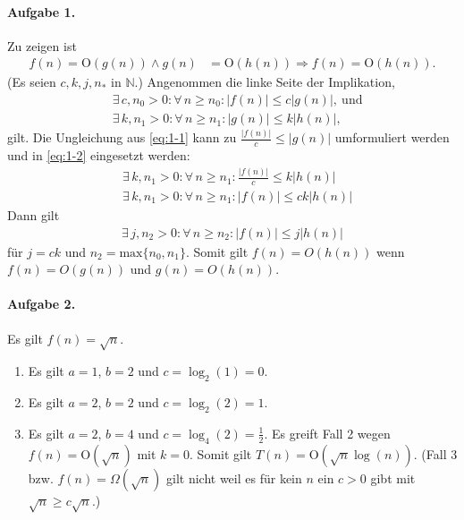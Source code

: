 \documentclass{article}
\newcommand{\bO}{\text{O}}
\begin{document}
\paragraph{Aufgabe 1.}

 Zu zeigen ist
\begin{align*}
    f(n) = \bO(g(n)) \land g(n) &= \bO(h(n)) \Rightarrow f(n) = \bO(h(n)).
\end{align*}
(Es seien $c, k, j, n_*$ in $\mathbb{N}$.) Angenommen die linke Seite der Implikation,
\begin{align}
    \label{eq:1-1} & \exists\, c, n_0 > 0 : \forall\, n \geq n_0 : |f(n)| \leq c|g(n)|,\ \text{und} \\
    \label{eq:1-2} & \exists\, k, n_1 > 0 : \forall\, n \geq n_1 : |g(n)| \leq k|h(n)|,
\end{align}
gilt. Die Ungleichung aus \eqref{eq:1-1} kann zu $\frac{|f(n)|}{c} \leq |g(n)|$ umformuliert werden und in \eqref{eq:1-2} eingesetzt werden:
\begin{align*}
    & \exists\, k, n_1 > 0 : \forall\, n \geq n_1 : \frac{|f(n)|}{c} \leq k|h(n)| \\
    & \exists\, k, n_1 > 0 : \forall\, n \geq n_1 : |f(n)| \leq ck|h(n)|
\end{align*}
Dann gilt
\begin{align*}
    \exists\, j, n_2 > 0 : \forall\, n \geq n_2 : |f(n)| \leq j|h(n)| 
\end{align*}
für $j = ck$ und $n_2 = \text{max}\{n_0, n_1\}$. Somit gilt $f(n) = O(h(n))$ wenn $f(n) = O(g(n))$ und $g(n) = O(h(n))$.

\paragraph{Aufgabe 2.}

Es gilt $f(n) = \sqrt{n}$.

\begin{enumerate}
    \item Es gilt $a = 1$, $b = 2$ und $c = \log_2(1) = 0$. 
    \item Es gilt $a = 2$, $b = 2$ und $c = \log_2(2) = 1$. 
    \item Es gilt $a = 2$, $b = 4$ und $c = \log_4(2) = \frac{1}{2}$. Es greift Fall 2 wegen $f(n) = \bO(\sqrt{n})$ mit $k = 0$. Somit gilt $T(n) = \bO(\sqrt{n} \log(n))$. (Fall 3 bzw. $f(n) = \Omega(\sqrt{n})$ gilt nicht weil es f\"ur kein $n$ ein $c > 0$ gibt mit $\sqrt{n}\geq c\sqrt{n}$.)
\end{enumerate}
\end{document}
